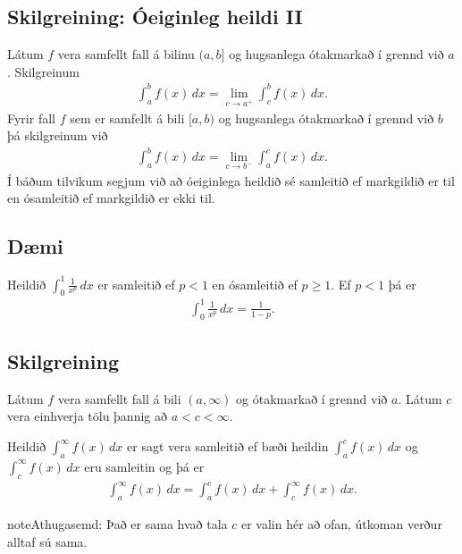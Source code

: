 \documentclass[a4paper,10pt,icelandic]{sphinxmanual}
\begin{document}
\subsection{Skilgreining: Óeiginleg heildi II}
\label{\detokenize{kafli06:skilgreining-oeiginleg-heildi-ii}}
Látum \(f\) vera samfellt fall á bilinu \((a, b]\) og hugsanlega
ótakmarkað í grennd við \(a\). Skilgreinum
\begin{equation*}
\begin{split}\int_a^b f(x)\,dx=\lim_{c\rightarrow a^+} \int_c^b f(x)\,dx.\end{split}
\end{equation*}
Fyrir fall \(f\) sem er samfellt á bili \([a, b)\) og hugsanlega
ótakmarkað í grennd við \(b\) þá skilgreinum við
\begin{equation*}
\begin{split}\int_a^b f(x)\,dx=\lim_{c\rightarrow b^-} \int_a^c f(x)\,dx.\end{split}
\end{equation*}
Í báðum tilvikum segjum við að óeiginlega heildið sé samleitið ef
markgildið er til en ósamleitið ef markgildið er ekki til.


\subsection{Dæmi}
\label{\detokenize{kafli06:id9}}
Heildið \(\int_0^1 \frac{1}{x^p}\,dx\) er samleitið ef \(p<1\)
en ósamleitið ef \(p\geq 1\). Ef \(p<1\) þá er
\begin{equation*}
\begin{split}\int_0^1
\frac{1}{x^p}\,dx=\frac{1}{1-p}.\end{split}
\end{equation*}

\subsection{Skilgreining}
\label{\detokenize{kafli06:id10}}
Látum \(f\) vera samfellt fall á bili \((a,\infty)\) og
ótakmarkað í grennd við \(a\). Látum \(c\) vera einhverja tölu
þannig að \(a<c<\infty\).

Heildið \(\int_a^\infty f(x)\,dx\) er sagt vera samleitið ef bæði
heildin \(\int_a^c f(x)\,dx\) og \(\int_c^\infty f(x)\,dx\) eru
samleitin og þá er
\begin{equation*}
\begin{split}\int_{a}^\infty f(x)\,dx=\int_{a}^c f(x)\,dx + \int_c^\infty f(x)\,dx.\end{split}
\end{equation*}
\begin{sphinxadmonition}{note}{Athugasemd:}
Það er sama hvað tala \(c\) er valin hér að ofan, útkoman verður
alltaf sú sama.
\end{sphinxadmonition}
\end{document}
